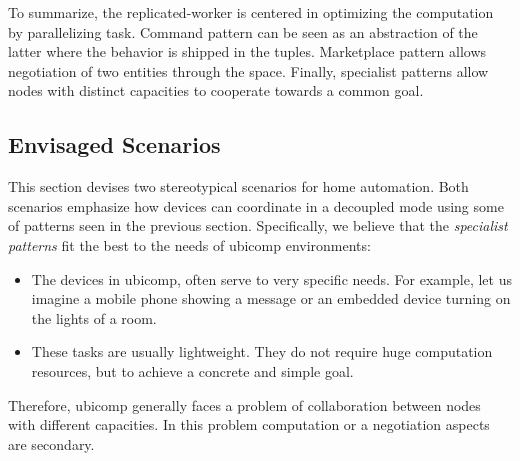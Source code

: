 To summarize, the replicated-worker is centered in optimizing the computation by parallelizing task.
Command pattern can be seen as an abstraction of the latter where the behavior is shipped in the tuples.
Marketplace pattern allows negotiation of two entities through the space.
Finally, specialist patterns allow nodes with distinct capacities to cooperate towards a common goal.





\subsection{Envisaged Scenarios}
\label{sec:envisaged_scenarios}

This section devises two stereotypical scenarios for home automation.
Both scenarios emphasize how devices can coordinate in a decoupled mode using some of patterns seen in the previous section. %
Specifically, we believe that the \emph{specialist patterns} fit the best to the needs of \ac{ubicomp} environments:
\begin{itemize}
  \item The devices in \ac{ubicomp}, often serve to very specific needs.
        For example, let us imagine a mobile phone showing a message or an embedded device turning on the lights of a room.
  \item These tasks are usually lightweight.
        They do not require huge computation resources, but to achieve a concrete and simple goal.
\end{itemize}
Therefore, \ac{ubicomp} generally faces a problem of collaboration between nodes with different capacities.
In this problem computation or a negotiation aspects are secondary. %


